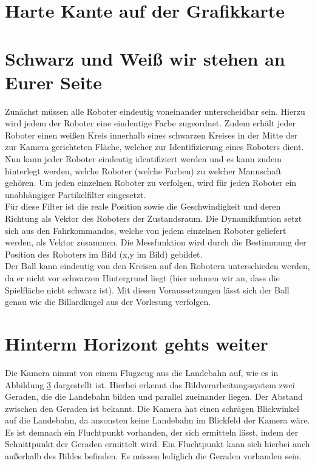 \documentclass{ezb}
\begin{document}

\section{Harte Kante auf der Grafikkarte}
\section{Schwarz und Weiß wir stehen an Eurer Seite}
Zunächst müssen alle Roboter eindeutig voneinander unterscheidbar sein. Hierzu wird jedem der Roboter eine eindeutige Farbe zugeordnet. Zudem erhält jeder Roboter einen weißen Kreis innerhalb eines schwarzen Kreises in der Mitte der zur Kamera gerichteten Fläche, welcher zur Identifizierung eines Roboters dient.\\
Nun kann jeder Roboter eindeutig identifiziert werden und es kann zudem hinterlegt werden, welche Roboter (welche Farben) zu welcher Mannschaft gehören.
Um jeden einzelnen Roboter zu verfolgen, wird für jeden Roboter ein unabhängiger Partikelfilter eingesetzt.\\
Für diese Filter ist die reale Position sowie die Geschwindigkeit und deren Richtung als Vektor des Roboters der Zustandsraum. Die Dynamikfuntion setzt sich aus den Fahrkommandos, welche von jedem einzelnen Roboter geliefert werden, als Vektor zusammen. Die Messfunktion wird durch die Bestimmung der Position des Roboters im Bild (x,y im Bild) gebildet.\\
Der Ball kann eindeutig von den Kreisen auf den Robotern unterschieden werden, da er nicht vor schwarzen Hintergrund liegt (hier nehmen wir an, dass die Spielfläche nicht schwarz ist). Mit diesen Voraussetzungen lässt sich der Ball genau wie die Billardkugel aus der Vorlesung verfolgen.
\section{Hinterm Horizont gehts weiter}
Die Kamera nimmt von einem Flugzeug aus die Landebahn auf, wie es in Abbildung \ref{} dargestellt ist. Hierbei erkennt das Bildverarbeitungssystem zwei Geraden, die die Landebahn bilden und parallel zueinander liegen. Der Abstand zwischen den Geraden ist bekannt. Die Kamera hat einen schrägen Blickwinkel auf die Landebahn, da ansonsten keine Landebahn im Blickfeld der Kamera wäre. Es ist demnach ein Fluchtpunkt vorhanden, der sich ermitteln lässt, indem der Schnittpunkt der Geraden ermittelt wird. Ein Fluchtpunkt kann sich hierbei auch außerhalb des Bildes befinden. Es müssen lediglich die Geraden vorhanden sein.
\end{document}

